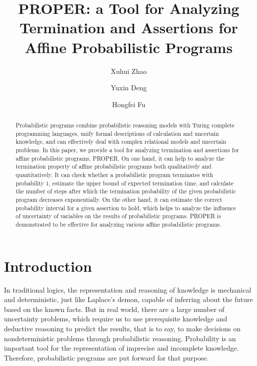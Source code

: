\documentclass[runningheads]{llncs}
\begin{document}
%
\title{PROPER: a Tool for Analyzing Termination and Assertions for Affine Probabilistic Programs}
%
%
\author{Xuhui Zhao\and
Yuxin Deng %
\and
Hongfei Fu}
%
%
%
\maketitle              %
%
\begin{abstract}
Probabilistic programs combine probabilistic reasoning models with Turing complete programming languages, unify formal descriptions of calculation and uncertain knowledge, and can effectively deal with complex relational models and uncertain problems. In this paper, we provide a tool for analyzing termination and assertions for affine probabilistic programs, PROPER. On one hand, it can help to analyze the termination property of affine probabilistic programs both qualitatively and quantitatively. It can check whether a probabilistic program terminates with probability $1$, estimate the upper bound of expected termination time, and calculate the number of steps after which the termination probability of the given probabilistic program decreases exponentially.  On the other hand, it can estimate the correct probability interval for a given assertion to hold, which helps to analyze the influence of uncertainty of variables on the results of probabilistic programs.  PROPER is demonstrated to be effective for analyzing various affine probabilistic programs.

\end{abstract}
%
%
%
\section{Introduction}
In traditional  logics, the representation and reasoning of knowledge is mechanical and deterministic, just like Laplace's demon, capable of inferring about the future based on the known facts. But in real world, there are a large number of uncertainty problems, which require us to use prerequisite knowledge and deductive reasoning to predict the results, that is to say, to make decisions on nondeterministic problems through probabilistic reasoning. Probability is an important tool for the representation of imprecise and incomplete knowledge. Therefore, probabilistic programs are put forward for that purpose. 
\end{document}
